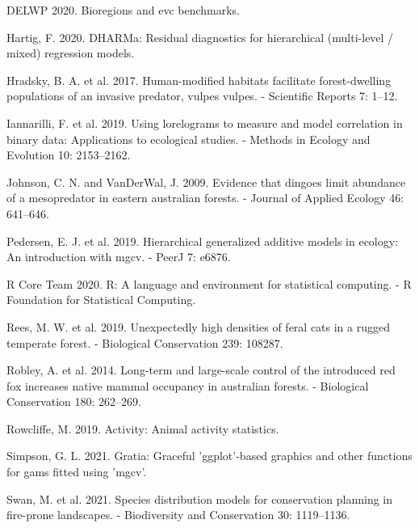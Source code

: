 \documentclass[]{elsarticle} %
\begin{document}
\hypertarget{refs}{}
\leavevmode\hypertarget{ref-delwp2020}{}%
DELWP 2020. Bioregions and evc benchmarks.

\leavevmode\hypertarget{ref-DHARMa}{}%
Hartig, F. 2020. DHARMa: Residual diagnostics for hierarchical (multi-level / mixed) regression models.

\leavevmode\hypertarget{ref-hradsky2017human}{}%
Hradsky, B. A. et al. 2017. Human-modified habitats facilitate forest-dwelling populations of an invasive predator, vulpes vulpes. - Scientific Reports 7: 1--12.

\leavevmode\hypertarget{ref-https:ux2fux2fdoi.orgux2f10.1111ux2f2041-210X.13308}{}%
Iannarilli, F. et al. 2019. Using lorelograms to measure and model correlation in binary data: Applications to ecological studies. - Methods in Ecology and Evolution 10: 2153--2162.

\leavevmode\hypertarget{ref-https:ux2fux2fdoi.orgux2f10.1111ux2fj.1365-2664.2009.01650.x}{}%
Johnson, C. N. and VanDerWal, J. 2009. Evidence that dingoes limit abundance of a mesopredator in eastern australian forests. - Journal of Applied Ecology 46: 641--646.

\leavevmode\hypertarget{ref-pedersen2019hierarchical}{}%
Pedersen, E. J. et al. 2019. Hierarchical generalized additive models in ecology: An introduction with mgcv. - PeerJ 7: e6876.

\leavevmode\hypertarget{ref-R}{}%
R Core Team 2020. R: A language and environment for statistical computing. - R Foundation for Statistical Computing.

\leavevmode\hypertarget{ref-REES2019108287}{}%
Rees, M. W. et al. 2019. Unexpectedly high densities of feral cats in a rugged temperate forest. - Biological Conservation 239: 108287.

\leavevmode\hypertarget{ref-ROBLEY2014262}{}%
Robley, A. et al. 2014. Long-term and large-scale control of the introduced red fox increases native mammal occupancy in australian forests. - Biological Conservation 180: 262--269.

\leavevmode\hypertarget{ref-rowcliffe_activity}{}%
Rowcliffe, M. 2019. Activity: Animal activity statistics.

\leavevmode\hypertarget{ref-gratia}{}%
Simpson, G. L. 2021. Gratia: Graceful 'ggplot'-based graphics and other functions for gams fitted using 'mgcv'.

\leavevmode\hypertarget{ref-swan2021species}{}%
Swan, M. et al. 2021. Species distribution models for conservation planning in fire-prone landscapes. - Biodiversity and Conservation 30: 1119--1136.
\end{document}
